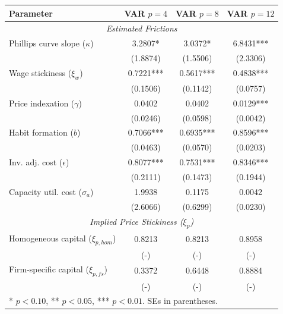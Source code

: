\begin{table}[htpb]
    \centering
    \scriptsize
    \begin{tabular}{lccc}
    \toprule
    \textbf{Parameter} & \textbf{VAR $p=4$} & \textbf{VAR $p=8$} & \textbf{VAR $p=12$} \\
    \midrule
    \multicolumn{4}{c}{\textit{Estimated Frictions}} \\
    Phillips curve slope ($\kappa$) & 3.2807* & 3.0372* & 6.8431*** \\
    & (1.8874) & (1.5506) & (2.3306) \\
    Wage stickiness ($\xi_w$) & 0.7221*** & 0.5617*** & 0.4838*** \\
    & (0.1506) & (0.1142) & (0.0757) \\
    Price indexation ($\gamma$) & 0.0402 & 0.0402 & 0.0129*** \\
    & (0.0246) & (0.0598) & (0.0042) \\
    Habit formation ($b$) & 0.7066*** & 0.6935*** & 0.8596*** \\
    & (0.0463) & (0.0570) & (0.0203) \\
    Inv. adj. cost ($\epsilon$) & 0.8077*** & 0.7531*** & 0.8346*** \\
    & (0.2111) & (0.1473) & (0.1944) \\
    Capacity util. cost ($\sigma_a$) & 1.9938 & 0.1175 & 0.0042 \\
    & (2.6066) & (0.6299) & (0.0230) \\
    \midrule
    \multicolumn{4}{c}{\textit{Implied Price Stickiness ($\xi_p$)}} \\
    Homogeneous capital ($\xi_{p, hom}$) & 0.8213 & 0.8213 & 0.8958 \\
    & (-) & (-) & (-) \\
    Firm-specific capital ($\xi_{p, fs}$) & 0.3372 & 0.6448 & 0.8884 \\
    & (-) & (-) & (-) \\
    \bottomrule
    \multicolumn{4}{l}{\tiny{* $p<0.10$, ** $p<0.05$, *** $p<0.01$. SEs in parentheses.}} \\
    \end{tabular}
\end{table}
